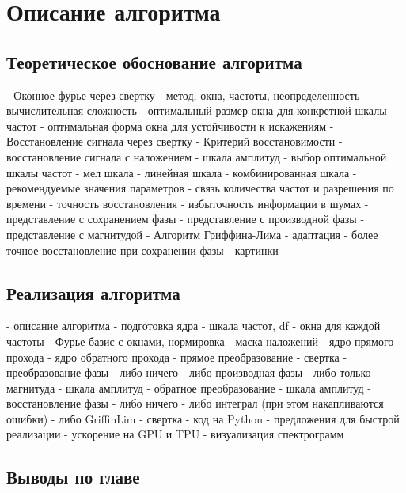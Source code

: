 \chapter{Описание алгоритма}
\label{cha:ch_2}

\section{Теоретическое обоснование алгоритма}



\begin{markdown}
 - Оконное фурье через свертку
   - метод, окна, частоты, неопределенность
   - вычислительная сложность
 - оптимальный размер окна для конкретной шкалы частот
 - оптимальная форма окна для устойчивости к искажениям
 - Восстановление сигнала через свертку
 - Критерий восстановимости
 - восстановление сигнала с наложением
 - шкала амплитуд
 - выбор оптимальной шкалы частот
   - мел шкала
   - линейная шкала
   - комбинированная шкала
 - рекомендуемые значения параметров
 - связь количества частот и разрешения по времени
 - точность восстановления
 - избыточность информации в шумах
 - представление с сохранением фазы
 - представление с производной фазы
 - представление с магнитудой
 - Алгоритм Гриффина-Лима
  - адаптация
  - более точное восстановление при сохранении фазы
 - картинки
\end{markdown}

\section{Реализация алгоритма}
\begin{markdown}
 - описание алгоритма
   - подготовка ядра
     - шкала частот, df
	 - окна для каждой частоты
	 - Фурье базис с окнами, нормировка
	 - маска наложений
	 - ядро прямого прохода
	 - ядро обратного прохода
   - прямое преобразование
     - свертка
	 - преобразование фазы
	   - либо ничего
	   - либо производная фазы
	   - либо только магнитуда
	 - шкала амплитуд
   - обратное преобразование
     - шкала амплитуд
	 - восстановление фазы
	   - либо ничего
	   - либо интеграл (при этом накапливаются ошибки)
	   - либо GriffinLim
	 - свертка
 - код на Python
 - предложения для быстрой реализации
 - ускорение на GPU и TPU
 - визуализация спектрограмм
\end{markdown}

\section{Выводы по главе}
